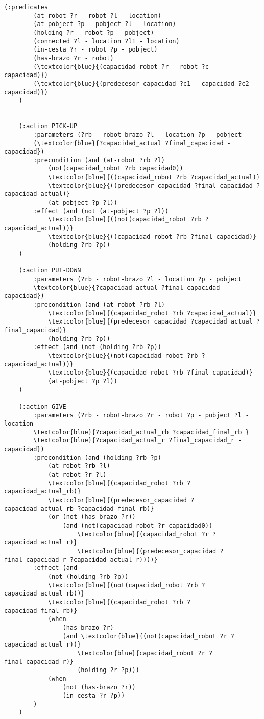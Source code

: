 \documentclass{article}
\begin{document}
\begin{Verbatim}[commandchars=\\\{\}]
    (:predicates
        (at-robot ?r - robot ?l - location)
        (at-pobject ?p - pobject ?l - location)
        (holding ?r - robot ?p - pobject)
        (connected ?l - location ?l1 - location)
        (in-cesta ?r - robot ?p - pobject)
        (has-brazo ?r - robot)
        (\textcolor{blue}{(capacidad_robot ?r - robot ?c - capacidad)})
        (\textcolor{blue}{(predecesor_capacidad ?c1 - capacidad ?c2 - capacidad)})
    )


    (:action PICK-UP
        :parameters (?rb - robot-brazo ?l - location ?p - pobject 
        (\textcolor{blue}{?capacidad_actual ?final_capacidad - capacidad})
        :precondition (and (at-robot ?rb ?l)
            (not(capacidad_robot ?rb capacidad0))
            \textcolor{blue}{((capacidad_robot ?rb ?capacidad_actual)}
            \textcolor{blue}{((predecesor_capacidad ?final_capacidad ?capacidad_actual)}
            (at-pobject ?p ?l))
        :effect (and (not (at-pobject ?p ?l))
            \textcolor{blue}{((not(capacidad_robot ?rb ?capacidad_actual))}
            \textcolor{blue}{((capacidad_robot ?rb ?final_capacidad)}
            (holding ?rb ?p))
    )

    (:action PUT-DOWN
        :parameters (?rb - robot-brazo ?l - location ?p - pobject 
        \textcolor{blue}{?capacidad_actual ?final_capacidad - capacidad})
        :precondition (and (at-robot ?rb ?l)
            \textcolor{blue}{(capacidad_robot ?rb ?capacidad_actual)}
            \textcolor{blue}{(predecesor_capacidad ?capacidad_actual ?final_capacidad)}
            (holding ?rb ?p))
        :effect (and (not (holding ?rb ?p))
            \textcolor{blue}{(not(capacidad_robot ?rb ?capacidad_actual))}
            \textcolor{blue}{(capacidad_robot ?rb ?final_capacidad)}
            (at-pobject ?p ?l))
    )

    (:action GIVE
        :parameters (?rb - robot-brazo ?r - robot ?p - pobject ?l - location 
        \textcolor{blue}{?capacidad_actual_rb ?capacidad_final_rb }
        \textcolor{blue}{?capacidad_actual_r ?final_capacidad_r - capacidad})
        :precondition (and (holding ?rb ?p)
            (at-robot ?rb ?l)
            (at-robot ?r ?l)
            \textcolor{blue}{(capacidad_robot ?rb ?capacidad_actual_rb)}
            \textcolor{blue}{(predecesor_capacidad ?capacidad_actual_rb ?capacidad_final_rb)}
            (or (not (has-brazo ?r))
                (and (not(capacidad_robot ?r capacidad0))
                    \textcolor{blue}{(capacidad_robot ?r ?capacidad_actual_r)}
                    \textcolor{blue}{(predecesor_capacidad ?final_capacidad_r ?capacidad_actual_r))))}
        :effect (and
            (not (holding ?rb ?p))
            \textcolor{blue}{(not(capacidad_robot ?rb ?capacidad_actual_rb))}
            \textcolor{blue}{(capacidad_robot ?rb ?capacidad_final_rb)}
            (when
                (has-brazo ?r)
                (and \textcolor{blue}{(not(capacidad_robot ?r ?capacidad_actual_r))}
                    \textcolor{blue}{capacidad_robot ?r ?final_capacidad_r)}
                    (holding ?r ?p)))
            (when
                (not (has-brazo ?r))
                (in-cesta ?r ?p))
        )
    )


\end{Verbatim}
\end{document}
